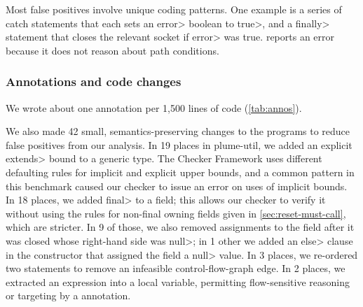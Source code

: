 Most false positives involve unique coding patterns.
One example
 is a series of catch
statements that each sets an \<error> boolean to \<true>, and
a \<finally> statement that closes the relevant socket if \<error>
was true.  \Tool reports an error because it does not reason about path
conditions.

\subsubsection{Annotations and code changes}\label{sec:annotations-and-code-changes}
\label{sec:annos}



We wrote about one annotation per 1,500 lines of code (\cref{tab:annos}).

We also
made 42 small, semantics-preserving changes to the programs to reduce
false positives from our analysis.
%
In 19 places in plume-util, we added an explicit \<extends> bound to a generic type.
The Checker Framework uses different defaulting rules for implicit and explicit
upper bounds, and a common pattern in this benchmark caused our checker to issue
an error on uses of implicit bounds.
%
In 18 places, we added \<final> to a field; this allows our checker to verify it without using
the rules for non-final owning fields given in \cref{sec:reset-must-call}, which are stricter.
In 9 of those, we also removed assignments to the field after it was closed whose right-hand
side was \<null>; in 1 other we added an \<else> clause in the constructor that assigned the field
a \<null> value.
%
In 3 places, we re-ordered two statements to remove an
infeasible control-flow-graph edge.
%
In 2 places, we extracted an expression into a local variable, permitting
flow-sensitive reasoning or targeting by a \CreatesMustCallFor annotation.

